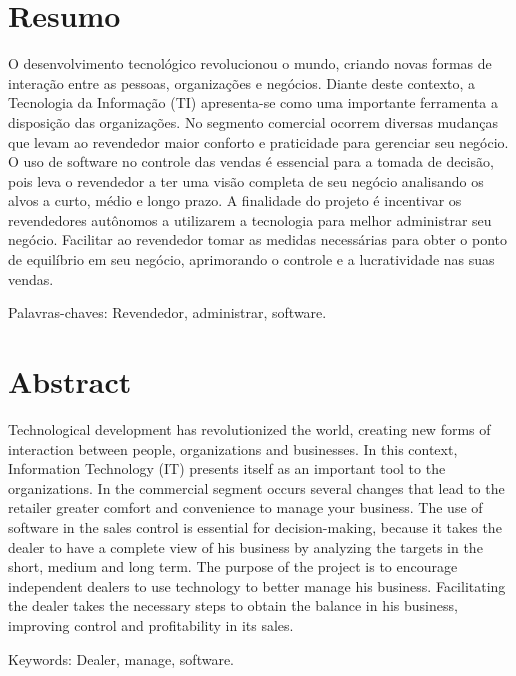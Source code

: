 \documentclass[chapter=TITLE,12pt,oneside,a4paper,english,french,sumario=tradicional,spanish,brazil,]{abntex2}
\begin{document}
\chapter*{{Resumo}}\thispagestyle{empty}
\begin{SingleSpace}
\noindent O desenvolvimento tecnológico revolucionou o mundo, criando novas formas de interação entre as pessoas, organizações e negócios. Diante deste contexto, a Tecnologia da Informação (TI) apresenta-se como uma importante ferramenta a disposição das organizações. No segmento comercial ocorrem diversas mudanças que levam ao revendedor maior conforto e praticidade para gerenciar seu negócio. O uso de software no controle das vendas é essencial para a tomada de decisão, pois leva o revendedor a ter uma visão completa de seu negócio analisando os alvos a curto, médio e longo prazo. A finalidade do projeto é incentivar os revendedores autônomos a utilizarem a tecnologia para melhor administrar seu negócio. Facilitar ao revendedor tomar as medidas necessárias para obter o ponto de equilíbrio em seu negócio, aprimorando o controle e a lucratividade nas suas vendas.

\noindent Palavras-chaves: Revendedor, administrar, software.
\end{SingleSpace}
\chapter*{{Abstract}}\thispagestyle{empty}
\begin{SingleSpace}
\noindent Technological development has revolutionized the world, creating new forms of interaction between people, organizations and businesses. In this context, Information Technology (IT) presents itself as an important tool to the organizations. In the commercial segment occurs several changes that lead to the retailer greater comfort and convenience to manage your business. The use of software in the sales control is essential for decision-making, because it takes the dealer to have a complete view of his business by analyzing the targets in the short, medium and long term. The purpose of the project is to encourage independent dealers to use technology to better manage his business. Facilitating the dealer takes the necessary steps to obtain the balance in his business, improving control and profitability in its sales.

\noindent Keywords: Dealer, manage, software.
\end{SingleSpace}
\newpage
\end{document}
